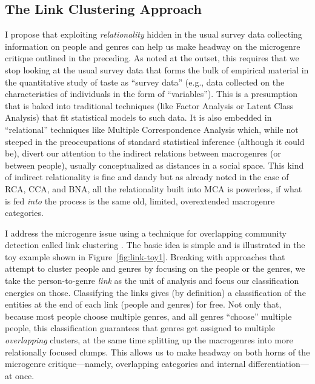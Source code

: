 \documentclass[a4paper,12pt]{extarticle}
\begin{document}
\subsection{The Link Clustering Approach}
I propose that exploiting {\em relationality} hidden in the usual survey data collecting information on people and genres can help us make headway on the microgenre critique outlined in the preceding. As noted at the outset, this requires that we stop looking at the usual survey data that forms the bulk of empirical material in the quantitative study of taste as ``survey data'' (e.g., data collected on the characteristics of individuals in the form of ``variables''). This is a presumption that is baked into traditional techniques (like Factor Analysis or Latent Class Analysis) that fit statistical models to such data. It is also embedded in ``relational'' techniques like Multiple Correspondence Analysis which, while not steeped in the preoccupations of standard statistical inference (although it could be), divert our attention to the indirect relations between macrogenres (or between people), usually conceptualized as distances in a social space. This kind of indirect relationality is fine and dandy but as already noted in the case of RCA, CCA, and BNA, all the relationality built into MCA is powerless, if what is fed {\em into} the process is the same old, limited, overextended macrogenre categories. 

I address the microgenre issue using a technique for overlapping community detection called link clustering \citep{ahn_etal10}. The basic idea is simple and is illustrated in the toy example shown in Figure~\ref{fig:link-toy1}. Breaking with approaches that attempt to cluster people and genres by focusing on the people or the genres, we take the person-to-genre {\em link} as the unit of analysis and focus our classification energies on those. Classifying the links gives (by definition) a classification of the entities at the end of each link (people and genres) for free. Not only that, because most people choose multiple genres, and all genres ``choose'' multiple people, this classification guarantees that genres get assigned to multiple \textit{overlapping} clusters, at the same time splitting up the macrogenres into more relationally focused clumps. This allows us to make headway on both horns of the microgenre critique---namely, overlapping categories and internal differentiation---at once.
\end{document}
